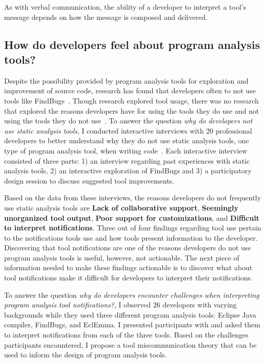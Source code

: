 \documentclass{llncs}
\begin{document}
As with verbal communication, the ability of a developer to interpret a tool's message depends on how the message is composed and delivered.

\subsection{How do developers feel about program analysis tools?}
Despite the possibility provided by program analysis tools for exploration and improvement of source code, research has found that developers often to not use tools like FindBugs~\cite{Ayewah:2008:FindBugs}.
Though research explored tool usage, there was no research that explored the reasons developers have for using the tools they do use and not using the tools they do not use~\cite{Bessey:2010:Coverity,Khoo:2008:PathProjection}.
To answer the question \emph{why do developers not use static analysis tools}, I conducted interactive interviews with 20 professional developers to better understand why they do not use static analysis tools, one type of program analysis tool, when writing code~\cite{johnson2013don}.
Each interactive interview consisted of three parts: 1) an interview regarding past experiences with static analysis tools, 2) an interactive exploration of FindBugs and 3) a participatory design session to discuss suggested tool improvements.

Based on the data from these interviews, the reasons developers do not frequently use static analysis tools are \textbf{Lack of collaborative support}, \textbf{Seemingly unorganized tool output}, \textbf{Poor support for customizations}, and \textbf{Difficult to interpret notifications}. 
Three out of four findings regarding tool use pertain to the notifications tools use and how tools present information to the developer.
Discovering that tool notifications are one of the reasons developers do not use program analysis tools is useful, however, not actionable. The next piece of information needed to make these findings actionable is to discover what about tool notifications make it difficult for developers to interpret their notifications. 

To answer the question \emph{why do developers encounter challenges when interpreting program analysis tool notifications?}, I observed 26 developers with varying backgrounds while they used three different program analysis tools: Eclipse Java compiler, FindBugs, and EclEmma. I presented participants with and asked them to interpret notifications from each of the three tools. Based on the challenges participants encountered, I propose a tool miscommunication theory that can be used to inform the design of program analysis tools.
\end{document}
